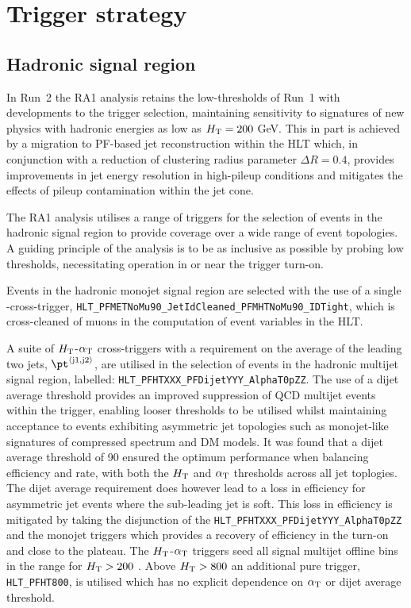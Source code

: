 \section{Trigger strategy}
\label{sec:triggers}


\subsection{Hadronic signal region\label{sec:hadronic_signal_region}}

In Run~2 the RA1 analysis retains the low-thresholds of Run~1 with developments 
to the trigger selection, maintaining sensitivity to signatures of new physics with hadronic 
energies as low as $\mbox{$H_\text{T}$} = 200$ GeV. This in part is achieved by a migration to PF-based 
jet reconstruction within the HLT which, in conjunction with a reduction of clustering radius 
parameter $\Delta R = 0.4$, provides improvements in jet energy resolution in high-pileup 
conditions and mitigates the effects of pileup contamination within the jet cone.

The RA1 analysis utilises a range of triggers for the selection of events in the hadronic signal region
to provide coverage over a wide range of event topologies. A guiding principle of the analysis is to be as
inclusive as possible by probing low thresholds, necessitating operation in or near the trigger turn-on.

Events in the hadronic monojet signal region are selected with the use of a single \mht-\met cross-trigger, 
\verb!HLT_PFMETNoMu90_JetIdCleaned_PFMHTNoMu90_IDTight!, which is cross-cleaned of muons in the computation 
of event variables in the HLT. 

A suite of $\mbox{$H_\text{T}$}$-$\alpha_{\text{T}}$ cross-triggers 
with a requirement on the average \pt of the leading two jets, $\pt^{\rm \left<j1,j2\right>}$, 
are utilised in the selection of events in the hadronic multijet signal region, labelled: 
\verb!HLT_PFHTXXX_PFDijetYYY_AlphaT0pZZ!. The use of a dijet average threshold provides an improved 
suppression of QCD multijet events within the trigger,
enabling looser \alphat thresholds to be utilised whilst maintaining acceptance to events exhibiting asymmetric jet 
topologies such as monojet-like signatures of compressed spectrum and DM models. It was found that a dijet average
threshold of 90 \GeV ensured the optimum performance when balancing efficiency and rate, with both the $\mbox{$H_\text{T}$}$ and $\alpha_{\text{T}}$
thresholds across all jet toplogies. The dijet average requirement does however lead to a loss in efficiency for 
asymmetric jet events where the sub-leading jet is soft. This loss in efficiency is mitigated by taking the 
disjunction of the \verb!HLT_PFHTXXX_PFDijetYYY_AlphaT0pZZ! and the monojet triggers which provides a recovery 
of efficiency in the turn-on and close to the plateau. The $\mbox{$H_\text{T}$}$-$\alpha_{\text{T}}$ triggers seed all signal multijet offline 
bins in the range for $\mbox{$H_\text{T}$} > 200$ \GeV. Above $\mbox{$H_\text{T}$} > 800$ an additional pure \scalht trigger, \verb!HLT_PFHT800!, 
is utilised which has no explicit dependence on $\alpha_{\text{T}}$ or dijet average threshold. 

